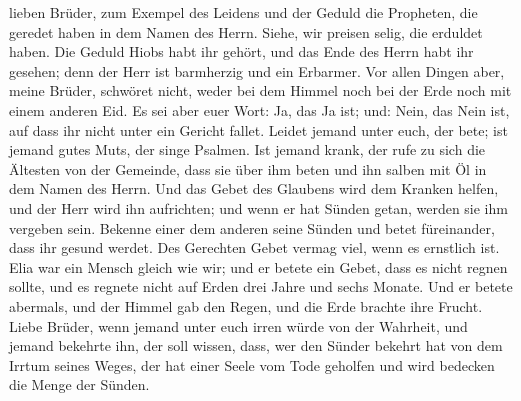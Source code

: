 lieben Brüder, zum Exempel des Leidens und der Geduld die Propheten, die
geredet haben in dem Namen des Herrn.  Siehe, wir preisen
selig, die erduldet haben. Die Geduld Hiobs habt ihr gehört, und das
Ende des Herrn habt ihr gesehen; denn der Herr ist barmherzig und ein
Erbarmer.  Vor allen Dingen aber, meine Brüder, schwöret
nicht, weder bei dem Himmel noch bei der Erde noch mit einem anderen
Eid. Es sei aber euer Wort: Ja, das Ja ist; und: Nein, das Nein ist, auf
dass ihr nicht unter ein Gericht fallet.  Leidet jemand
unter euch, der bete; ist jemand gutes Muts, der singe Psalmen.
 Ist jemand krank, der rufe zu sich die Ältesten von der
Gemeinde, dass sie über ihm beten und ihn salben mit Öl in dem Namen des
Herrn.  Und das Gebet des Glaubens wird dem Kranken helfen,
und der Herr wird ihn aufrichten; und wenn er hat Sünden getan, werden
sie ihm vergeben sein.  Bekenne einer dem anderen seine
Sünden und betet füreinander, dass ihr gesund werdet. Des Gerechten
Gebet vermag viel, wenn es ernstlich ist.  Elia war ein
Mensch gleich wie wir; und er betete ein Gebet, dass es nicht regnen
sollte, und es regnete nicht auf Erden drei Jahre und sechs Monate.
 Und er betete abermals, und der Himmel gab den Regen, und
die Erde brachte ihre Frucht.  Liebe Brüder, wenn jemand
unter euch irren würde von der Wahrheit, und jemand bekehrte ihn,
 der soll wissen, dass, wer den Sünder bekehrt hat von dem
Irrtum seines Weges, der hat einer Seele vom Tode geholfen und wird
bedecken die Menge der Sünden.
